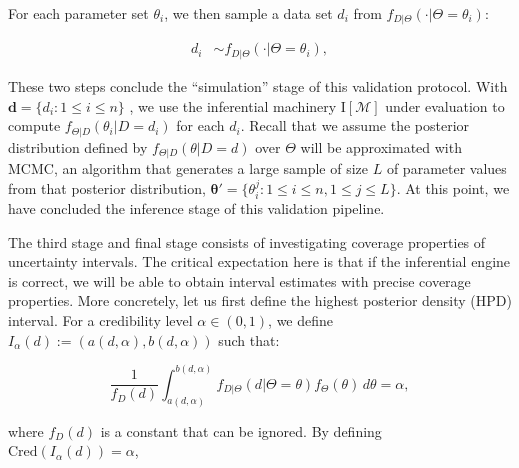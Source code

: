 \documentclass[oneside]{article}
\begin{document}
For each parameter set $\theta_i$, we then sample a data set
$d_i$ from
$f_{D|\Theta}(\cdot|\Theta=\theta_i)$:

\vspace{-1cm}
\begin{align*}
   d_i & \sim  f_{D|\Theta}(\cdot | \Theta=\theta_i),
\end{align*}

These two steps conclude the ``simulation'' stage of this validation protocol.
With
$\boldsymbol{d} = \{d_i: 1 \leq i \leq n\}$
, we use the inferential machinery $\text{I}[\mathcal{M}]$ under
evaluation to compute
$f_{\Theta|D}(\theta_i|D=d_i)$ for each $d_i$.
Recall that we assume the posterior distribution defined by $f_{\Theta|D}(\theta|D=d)$ over $\Theta$ will be approximated with MCMC, an algorithm that generates a large sample of size $L$ of parameter values from that posterior distribution, $\boldsymbol{\theta}' = \{ \theta_i^j: 1 \leq i \leq n, 1 \leq j \leq L\}$.
At this point, we have concluded the inference stage of this validation pipeline.

The third stage and final stage consists of investigating coverage properties of uncertainty intervals.
The critical expectation here is that if the inferential engine is correct, we will be able to obtain interval estimates with precise coverage properties.
More concretely, let us first define the highest posterior density (HPD) interval.
For a credibility level $\alpha \in (0, 1)$, we define $I_\alpha(d) := (a(d, \alpha), b(d, \alpha))$
such that:


\begin{equation*}
  \frac{1}{f_D(d)} \int_{a(d, \alpha)}^{b(d,\alpha)} f_{D|\Theta}(d | \Theta=\theta)f_\Theta(\theta)\, d\theta = \alpha,
\end{equation*}

\noindent where
$f_D(d)$
is a constant that can be ignored.
By defining $\text{Cred}(I_\alpha(d)) = \alpha$,
\end{document}
